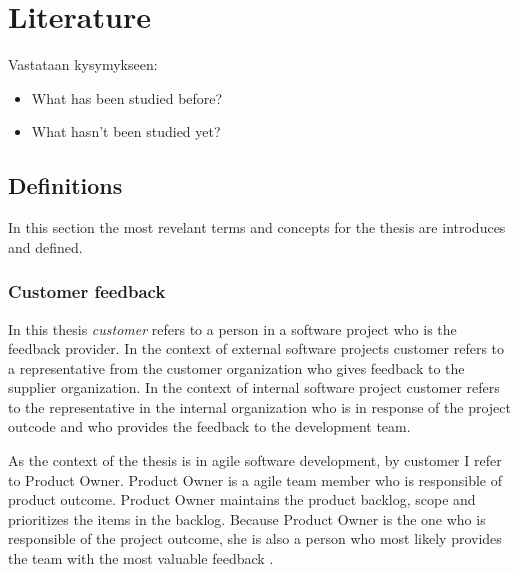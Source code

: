 \documentclass[english,12pt,a4paper,pdftex]{article}
\begin{document}
\clearpage

\section{Literature}

Vastataan kysymykseen:

\begin{itemize}
\item What has been studied before?
\item What hasn't been studied yet?
\end{itemize}

\subsection{Definitions}

In this section the most revelant terms and concepts for the thesis are introduces and defined.

\subsubsection{Customer feedback}

In this thesis \textit{customer} refers to a person in a software project who is the feedback provider. In the context of external software projects customer refers to a representative from the customer organization who gives feedback to the supplier organization. In the context of internal software project customer refers to the representative in the internal organization who is in response of the project outcode and who provides the feedback to the development team.

As the context of the thesis is in agile software development, by customer I refer to Product Owner. Product Owner is a agile team member who is responsible of product outcome. Product Owner maintains the product backlog, scope and prioritizes the items in the backlog. Because Product Owner is the one who is responsible of the project outcome, she is also a person who most likely provides the team with the most valuable feedback \citep{pichler2010}.
\end{document}
